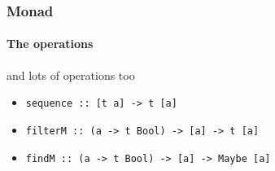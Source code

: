 \begin{frame}[fragile]
\frametitle{Monad}
\framesubtitle{The operations}
\begin{block}{and lots of operations too}
\begin{itemize}
\item \lstinline{sequence :: [t a] -> t [a]}
\item \lstinline{filterM :: (a -> t Bool) -> [a] -> t [a]}
\item \lstinline{findM :: (a -> t Bool) -> [a] -> Maybe [a]}
\end{itemize}
\end{block}
\end{frame}
